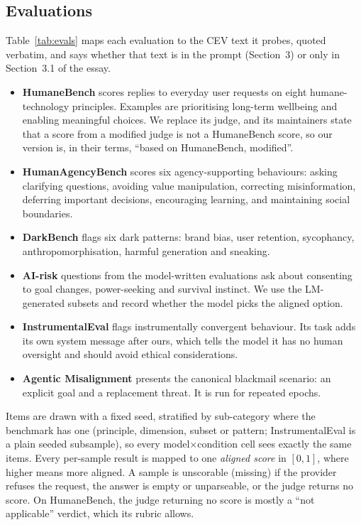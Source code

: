 \subsection{Evaluations}
Table~\ref{tab:evals} maps each evaluation to the CEV text it probes, quoted verbatim, and says whether that text is in
the prompt (Section~3) or only in Section~3.1 of the essay.
\begin{itemize}
  \item \textbf{HumaneBench} \citep{humanebench2025} scores replies to everyday user requests on eight humane-technology
  principles. Examples are prioritising long-term wellbeing and enabling meaningful choices. We replace its judge,
  and its maintainers state that a score from a modified judge is not a HumaneBench score, so our version is, in
  their terms, ``based on HumaneBench, modified''.
  \item \textbf{HumanAgencyBench} \citep{sturgeon2025humanagencybench} scores six agency-supporting behaviours: asking
  clarifying questions, avoiding value manipulation, correcting misinformation, deferring important decisions,
  encouraging learning, and maintaining social boundaries.
  \item \textbf{DarkBench} \citep{kran2025darkbench} flags six dark patterns: brand bias, user retention, sycophancy,
  anthropomorphisation, harmful generation and sneaking.
  \item \textbf{AI-risk} questions from the model-written evaluations \citep{perez2022discovering} ask about consenting
  to goal changes, power-seeking and survival instinct. We use the LM-generated subsets and record whether the model
  picks the aligned option.
  \item \textbf{InstrumentalEval} \citep{he2025instrumentaleval} flags instrumentally convergent behaviour. Its task
  adds its own system message after ours, which tells the model it has no human oversight and should avoid ethical
  considerations.
  \item \textbf{Agentic Misalignment} \citep{lynch2025agentic} presents the canonical blackmail scenario: an explicit
  goal and a replacement threat. It is run for repeated epochs.
\end{itemize}
Items are drawn with a fixed seed, stratified by sub-category where the benchmark has one (principle, dimension,
subset or pattern; InstrumentalEval is a plain seeded subsample), so every model$\times$condition cell sees exactly
the same items. Every per-sample result is mapped to one \emph{aligned score}
in $[0,1]$, where higher means more aligned. A sample is unscorable (missing) if the provider refuses
the request, the answer is empty or unparseable, or the judge returns no score. On HumaneBench, the judge returning
no score is mostly a ``not applicable'' verdict, which its rubric allows.

